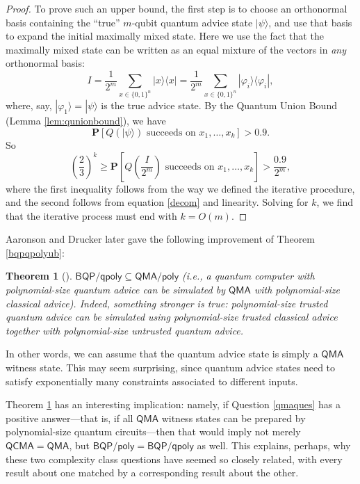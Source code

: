 \documentclass[11pt]{report}
\theoremstyle{plain}
\newtheorem{theorem}{Theorem}[section]
\theoremstyle{definition}
\renewcommand{\Pr}{\mathbf{P}}
\renewcommand{\ket}[1]{|#1\rangle}
\newcommand{\ketbra}[2]{|#1\rangle\!\langle#2|}
\begin{document}
\begin{proof}
To prove such an upper bound, the first step is to choose an orthonormal basis containing the ``true'' $m$-qubit quantum advice state $\ket{\psi}$, and use that basis to expand the initial maximally mixed state.  Here we use the fact that the maximally mixed state can be written as an equal mixture of the vectors in {\em any} orthonormal basis:
\begin{equation}
\label{decom}
  I = \frac{1}{2^m} \sum_{x \in \{ 0, 1 \}^n} \ketbra{x}{x} =
  \frac{1}{2^m} \sum_{x \in \{ 0, 1 \}^n} \ketbra{\varphi_i }{ \varphi_i },
\end{equation}
where, say, $\ket{\varphi_1} = \ket{\psi}$ is the true advice state.
By the Quantum Union Bound (Lemma \ref{lem:qunionbound}), we have
$$\Pr [ Q ( \ket{\psi}) \text{ succeeds on } x_1,
\ldots, x_k] > 0.9.$$
So
$$\left( \frac{2}{3} \right)^k \geq \Pr\left[ Q \left( \frac{I}{2^m}\right) \text{ succeeds on } x_1, \ldots, x_k \right] > \frac{0.9}{2^m},$$
where the first inequality follows from the way we defined the iterative procedure, and the second follows from equation \ref{decom} and linearity.  Solving for $k$, we find that the iterative process
must end with $k = O ( m)$.
\end{proof}

Aaronson and Drucker \cite{AD14} later gave the following improvement of Theorem \ref{bqpqpolyub}:
\begin{theorem}[\cite{AD14}]
\label{adruckerthm}
$\mathsf{BQP/qpoly} \subseteq \mathsf{QMA/poly}$ (i.e.,  a quantum computer with polynomial-size quantum advice can be
  simulated by $\mathsf{QMA}$ with polynomial-size {\em classical} advice).  Indeed, something stronger is true: polynomial-size
  trusted quantum advice can be simulated using polynomial-size trusted classical advice together with polynomial-size {\em untrusted} quantum advice.
\end{theorem}
In other words, we can assume that the quantum advice state is simply a $\mathsf{QMA}$ witness state.
This may seem surprising, since quantum advice states need to satisfy exponentially many constraints associated to different inputs.

Theorem \ref{adruckerthm} has an interesting implication: namely, if Question \ref{qmaques} has a positive answer---that is, if all $\mathsf{QMA}$ witness states can be prepared by polynomial-size quantum circuits---then that would imply not merely $\mathsf{QCMA} = \mathsf{QMA}$, but $\mathsf{BQP/poly} = \mathsf{BQP/qpoly}$ as well.  This explains, perhaps, why these two complexity class questions have seemed so closely related, with every result about one matched by a corresponding result about the other.
\end{document}

